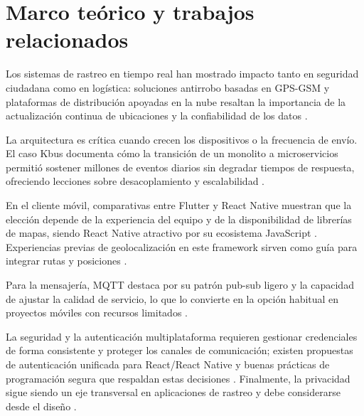 \section{Marco teórico y trabajos relacionados}
Los sistemas de rastreo en tiempo real han mostrado impacto tanto en seguridad ciudadana como en logística: soluciones antirrobo basadas en GPS-GSM y plataformas de distribución apoyadas en la nube resaltan la importancia de la actualización continua de ubicaciones y la confiabilidad de los datos \cite{gorret2025vehicle, logistica2025seguimiento}.

La arquitectura es crítica cuando crecen los dispositivos o la frecuencia de envío. El caso Kbus documenta cómo la transición de un monolito a microservicios permitió sostener millones de eventos diarios sin degradar tiempos de respuesta, ofreciendo lecciones sobre desacoplamiento y escalabilidad \cite{torres2020kbus}.

En el cliente móvil, comparativas entre Flutter y React Native muestran que la elección depende de la experiencia del equipo y de la disponibilidad de librerías de mapas, siendo React Native atractivo por su ecosistema JavaScript \cite{macias2021flutterrn}. Experiencias previas de geolocalización en este framework sirven como guía para integrar rutas y posiciones \cite{dedios2021geolocalizacion}.

Para la mensajería, MQTT destaca por su patrón pub-sub ligero y la capacidad de ajustar la calidad de servicio, lo que lo convierte en la opción habitual en proyectos móviles con recursos limitados \cite{ortiz2022smolcomm, terrones2022presencia}.

La seguridad y la autenticación multiplataforma requieren gestionar credenciales de forma consistente y proteger los canales de comunicación; existen propuestas de autenticación unificada para React/React Native y buenas prácticas de programación segura que respaldan estas decisiones \cite{ye2022autenticacion, madrigal2020seguridad}. Finalmente, la privacidad sigue siendo un eje transversal en aplicaciones de rastreo y debe considerarse desde el diseño \cite{react2021}.

